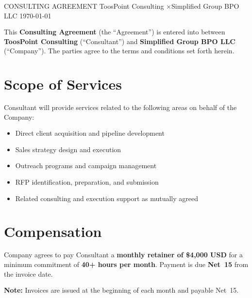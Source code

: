 \documentclass{toospoint}
\begin{document}
\contracttitle
  {CONSULTING AGREEMENT}
  {ToosPoint Consulting \quad×\quad Simplified Group BPO LLC}
  {\today}

\begin{clausebox}
\sffamily\small
This \textbf{Consulting Agreement} (the ``Agreement'') is entered into between
\textbf{ToosPoint Consulting} (``Consultant'') and \textbf{Simplified Group BPO LLC}
(``Company''). The parties agree to the terms and conditions set forth herein.
\end{clausebox}

\vspace{10pt}

\section{Scope of Services}

Consultant will provide services related to the following areas on behalf of the Company:

\begin{itemize}[leftmargin=1.5em, itemsep=4pt, topsep=4pt]
  \item Direct client acquisition and pipeline development
  \item Sales strategy design and execution
  \item Outreach programs and campaign management
  \item RFP identification, preparation, and submission
  \item Related consulting and execution support as mutually agreed
\end{itemize}

\section{Compensation}

Company agrees to pay Consultant a \textbf{monthly retainer of \$4,000 USD} for a
minimum commitment of \textbf{40+ hours per month}. Payment is due \textbf{Net~15}
from the invoice date.

\begin{clausebox}
\sffamily\footnotesize\color{TPGray}
\textbf{Note:} Invoices are issued at the beginning of each month and payable Net~15.
\end{clausebox}
\end{document}
